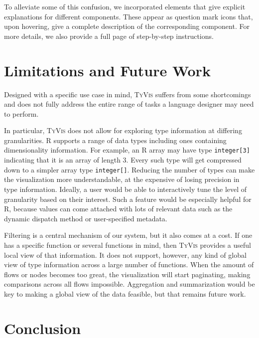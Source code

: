 \documentclass{vgtc}                          %
\newcommand{\ourmethodplaintext}{\textsc{TyVis}\xspace}
\newcommand{\ourmethod}{{\sc \ourmethodplaintext}\xspace}
\begin{document}
To alleviate some of this confusion, we incorporated elements that give explicit explanations for different components. These appear as question mark icons that, upon hovering, give a complete description of the corresponding component. For more details, we also provide a full page of step-by-step instructions.



\section{Limitations and Future Work}

Designed with a specific use case in mind, \ourmethod suffers from some shortcomings and does not fully address the entire range of tasks a language designer may need to perform.

In particular, \ourmethod does not allow for exploring type information at differing granularities.
R supports a range of data types including ones containing dimensionality information.
For example, an R array may have type {\tt integer[3]} indicating that it is an array of length $3$.
Every such type will get compressed down to a simpler array type {\tt integer[]}.
Reducing the number of types can make the visualization more understandable, at the expensive of losing precision in type information.
Ideally, a user would be able to interactively tune the level of granularity based on their interest.
Such a feature would be especially helpful for R, because values can come attached with lots of relevant data such as the dynamic dispatch method or user-specified metadata.

Filtering is a central mechanism of our system, but it also comes at a cost.
If one has a specific function or several functions in mind, then \ourmethod provides a useful local view of that information.
It does not support, however, any kind of global view of type information across a large number of functions.
When the amount of flows or nodes becomes too great, the visualization will start paginating, making comparisons across all flows impossible.
Aggregation and summarization would be key to making a global view of the data feasible, but that remains future work.


\section{Conclusion}
\end{document}
